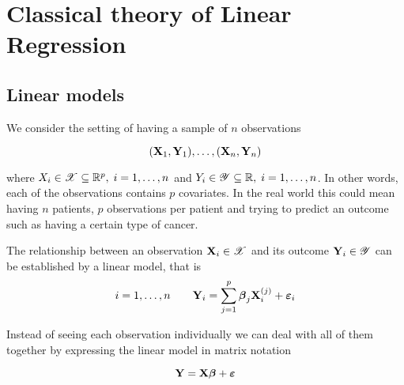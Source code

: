 \chapter{Classical theory of Linear Regression}

\section{Linear models}

We consider the setting of having a sample of $n$ observations

\[
    (\mathbf{X}_1, \mathbf{Y}_1), \ldots ,(\mathbf{X}_n, \mathbf{Y}_n)
\]

where $X_i \in \mathscr{X} \subseteq \mathbb{R}^p, \; i = 1, \ldots, n$ and $Y_i \in \mathscr{Y} \subseteq \mathbb{R}, \; i = 1, \ldots, n$. In other words, each of the observations contains $p$ covariates. In the real world this could mean having $n$ patients, $p$ observations per patient and trying to predict an outcome such as having a certain type of cancer.

\begin{definition}
    The relationship between an observation $\mathbf{X}_i \in \mathscr{X}$ and its outcome $\mathbf{Y}_i \in \mathscr{Y}$ can be established by a linear model, that is
    \begin{equation}
        i = 1, \ldots, n \qquad \mathbf{Y}_{i} = \sum_{j=1}^{p} \boldsymbol{\beta}_{j} \mathbf{X}_{i}^{(j)} + \boldsymbol{\varepsilon}_{i}
    \end{equation}
\end{definition}

Instead of seeing each observation individually we can deal with all of them together by expressing the linear model in matrix notation

\begin{equation}
    \label{eqn: linear model (matrix)}
    \mathbf{Y} = \mathbf{X} \boldsymbol{\beta} + \boldsymbol{\varepsilon}
\end{equation}

